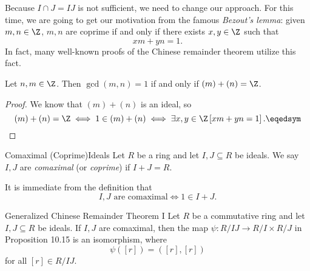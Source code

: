 \documentclass[pmath347]{subfiles}
\begin{document}
    \np Because $I\cap J = IJ$ is not sufficient, we need to change our approach. For this time, we are going to get our motivation from the famous \textit{Bezout's lemma}: given $m,n\in\Z$, $m,n$ are coprime if and only if there exists $x,y\in\Z$ such that
    \begin{equation*}
        xm + yn = 1.
    \end{equation*}
    In fact, many well-known proofs of the Chinese remainder theorem utilize this fact. 

    \begin{prop}{}
        Let $n,m\in\Z$. Then $\gcd\left( m,n \right) = 1$ if and only if $\left( m \right) + \left( n \right) = \Z$.
    \end{prop}
    
    \begin{proof}
        We know that $\left( m \right) + \left( n \right)$ is an ideal, so
        \begin{equation*}
            \left( m \right) + \left( n \right) = \Z \iff 1\in \left( m \right) + \left( n \right) \iff \exists x,y\in\Z\left[ xm+yn=1 \right] . \eqedsym
        \end{equation*}
    \end{proof}

    \begin{definition}{Comaximal (Coprime)}{Ideals}
        Let $R$ be a ring and let $I,J\subseteq R$ be ideals. We say $I,J$ are \emph{comaximal} (or \emph{coprime}) if $I+J=R$.
    \end{definition}

    \noindent It is immediate from the definition that
    \begin{equation*}
        I,J\text{ are comaximal}\iff 1\in I+J.
    \end{equation*}

    \begin{theorem}{Generalized Chinese Remainder Theorem I}
        Let $R$ be a commutative ring and let $I,J\subseteq R$ be ideals. If $I,J$ are comaximal, then the map $\psi:R /IJ\to R /I\times R /J$ in Proposition 10.15 is an isomorphism, where
        \begin{equation*}
            \psi\left( \left[ r \right]  \right) = \left( \left[ r \right] , \left[ r \right]  \right) 
        \end{equation*}
        for all $\left[ r \right] \in R /IJ$.
    \end{theorem}
\end{document}
